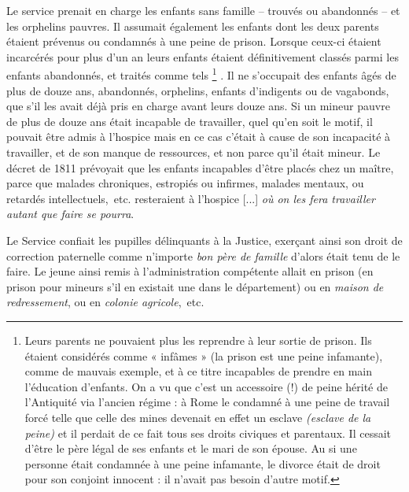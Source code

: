  Le service prenait en charge les enfants sans famille -- trouvés ou abandonnés -- et les orphelins pauvres. Il assumait également les enfants dont les deux parents étaient prévenus ou condamnés à une peine de prison. Lorsque ceux-ci étaient incarcérés pour plus d'un an leurs enfants étaient définitivement classés parmi les enfants abandonnés, et traités comme tels%
\footnote{Leurs parents ne pouvaient plus les reprendre à leur sortie de prison. Ils étaient considérés comme « infâmes » (la prison est une peine infamante), comme de mauvais exemple, et à ce titre incapables de prendre en main l'éducation d'enfants. On a vu que c'est un accessoire (!) de peine hérité de l'Antiquité via l'ancien régime : à Rome le condamné à une peine de travail forcé telle que celle des mines devenait en effet  un esclave \emph{(esclave de la peine)} et il perdait de ce fait tous ses droits civiques et parentaux. Il cessait d'être le père légal de ses enfants et le mari de son épouse. Au  si une personne était condamnée à une peine infamante, le divorce était de droit pour son conjoint innocent : il n'avait pas besoin d'autre motif.}%
. Il ne s'occupait des enfants âgés de plus de douze ans, abandonnés, orphelins, enfants d'indigents ou de vagabonds, que s'il les avait déjà pris en charge avant leurs douze ans. Si un mineur pauvre de plus de douze ans était incapable de travailler, quel qu'en soit le motif, il pouvait être admis à l'hospice mais en ce cas c'était à cause de son incapacité à travailler, et de son manque de ressources, et non parce qu'il était mineur. Le décret de 1811 prévoyait que les enfants incapables d'être placés chez un maître, parce que malades chroniques, estropiés ou infirmes, malades mentaux, ou retardés intellectuels,~etc. resteraient à l'hospice [...] \emph{où on les fera travailler autant que faire se pourra}.

 Le Service confiait les pupilles délinquants à la Justice, exerçant ainsi son droit de correction paternelle comme n'importe \emph{bon père de famille} d'alors était tenu de le faire. Le jeune ainsi remis à l'administration compétente allait en prison (en prison pour mineurs s'il en existait une dans le département) ou en \emph{maison de redressement}, ou en \emph{colonie agricole},~etc. 

